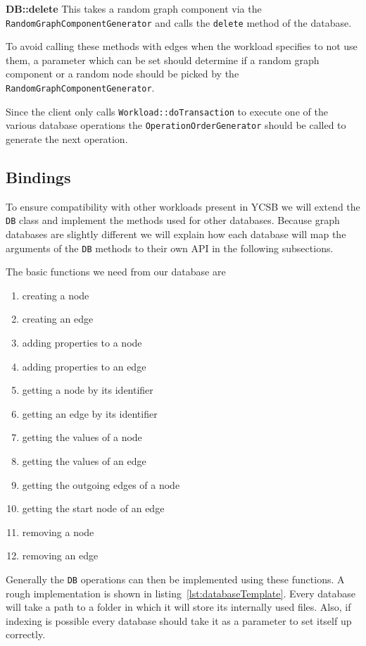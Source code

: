 \textbf{DB::delete} \newline
This takes a random graph component via the \texttt{RandomGraphComponentGenerator} and calls the \texttt{delete} method of the database.

To avoid calling these methods with edges when the workload specifies to not use them,
a parameter which can be set should determine if a random graph component or a random node should be picked by the \texttt{RandomGraphComponentGenerator}.

Since the client only calls \texttt{Workload::doTransaction} to execute one of the various database operations the \texttt{OperationOrderGenerator} should be called to generate the next operation.

\subsection{Bindings}
\label{ch:design:se:bindings}
To ensure compatibility with other workloads present in YCSB we will extend the \texttt{DB} class and implement the methods used for other databases.
Because graph databases are slightly different we will explain how each database will map the arguments of the \texttt{DB} methods to their own API in the following subsections.

The basic functions we need from our database are

\begin{enumerate}
  \item creating a node
  \item creating an edge
  \item adding properties to a node
  \item adding properties to an edge
  \item getting a node by its identifier
  \item getting an edge by its identifier
  \item getting the values of a node
  \item getting the values of an edge
  \item getting the outgoing edges of a node
  \item getting the start node of an edge
  \item removing a node
  \item removing an edge
\end{enumerate}

Generally the \texttt{DB} operations can then be implemented using these functions.
A rough implementation is shown in listing~\ref{lst:databaseTemplate}.
Every database will take a path to a folder in which it will store its internally used files.
Also,
if indexing is possible every database should take it as a parameter to set itself up correctly.

